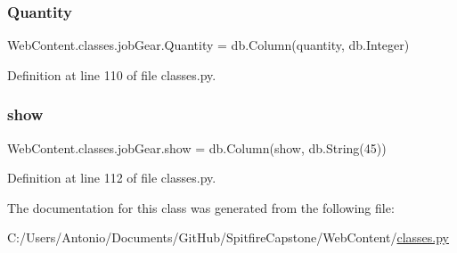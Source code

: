 \subsubsection{\texorpdfstring{Quantity}{Quantity}}
{\footnotesize\ttfamily Web\+Content.\+classes.\+job\+Gear.\+Quantity = db.\+Column(\textquotesingle{}quantity\textquotesingle{}, db.\+Integer)\hspace{0.3cm}{\ttfamily [static]}}



Definition at line 110 of file classes.\+py.

\mbox{\label{class_web_content_1_1classes_1_1job_gear_ac60ca08b7517caefae54fd99e8c2f854}} 
\subsubsection{\texorpdfstring{show}{show}}
{\footnotesize\ttfamily Web\+Content.\+classes.\+job\+Gear.\+show = db.\+Column(\textquotesingle{}show\textquotesingle{}, db.\+String(45))\hspace{0.3cm}{\ttfamily [static]}}



Definition at line 112 of file classes.\+py.



The documentation for this class was generated from the following file\+:\begin{DoxyCompactItemize}
\item 
C\+:/\+Users/\+Antonio/\+Documents/\+Git\+Hub/\+Spitfire\+Capstone/\+Web\+Content/\hyperlink{classes_8py}{classes.\+py}\end{DoxyCompactItemize}
